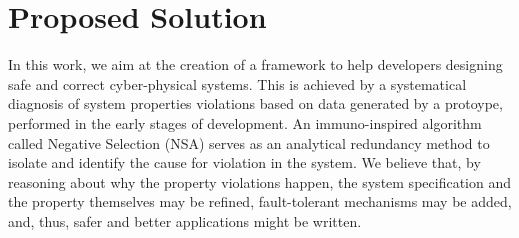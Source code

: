   




\vspace{0.5 cm}

\noindent{}
\vspace{0.3 cm}

\section{Proposed Solution}

In this work, we aim at the creation of a framework to help developers designing safe and correct cyber-physical systems. This is achieved by a systematical diagnosis of system properties violations based on data generated by a protoype, performed in the early stages of development. An immuno-inspired algorithm called Negative Selection (NSA) serves as an analytical redundancy method to isolate and identify the cause for violation in the system. We believe that, by reasoning about why the property violations happen, the system specification and the property themselves may be refined, fault-tolerant mechanisms may be added, and, thus, safer and better applications might be written.

